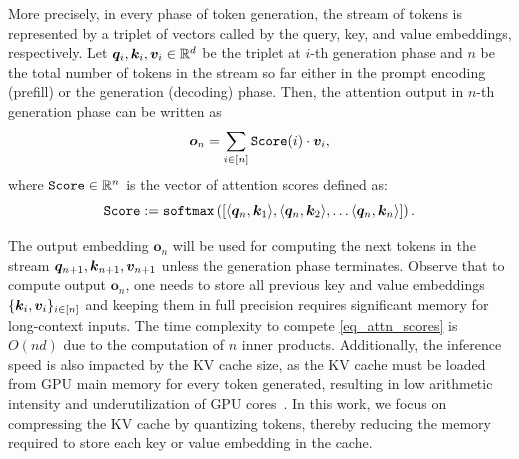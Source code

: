 \documentclass[11pt]{article}
\theoremstyle{plain}
\theoremstyle{definition}
\theoremstyle{remark}
\begin{document}
More precisely, in every phase of token generation, the stream of tokens is represented by a triplet of vectors called by the query, key, and value embeddings, respectively. 
Let ${\bm q}_i, {\bm k}_i, {\bm v}_i \in \mathbb{R}^d$ be the triplet at $i$-th generation phase and $n$ be the total number of tokens in the stream so far either in the prompt encoding (prefill) or the generation (decoding) phase. Then, the attention output in $n$-th generation phase can be written as
\begin{equation} \label{eq_attn_output}
    {\bm o}_{n} = \sum_{i \in [n]} {\tt Score}(i) \cdot {\bm v}_i, 
\end{equation}
where ${\tt Score} \in \mathbb{R}^n$ is the vector of attention scores defined as:
\begin{equation}\label{eq_attn_scores}
{\tt Score} :={\tt softmax}\left(
[\langle {\bm q}_n, {\bm k}_1 \rangle, \langle {\bm q}_n, {\bm k}_2 \rangle, \ldots \langle {\bm q}_n, {\bm k}_n \rangle]
\right).
\end{equation}

The output embedding ${\bm o}_n$ will be used for computing the next tokens in the stream ${\bm q}_{n+1}, {\bm k}_{n+1}, {\bm v}_{n+1}$ unless the generation phase terminates. 
Observe that to compute output ${\bm o}_{n}$, one needs to store all previous key and value embeddings $\{{\bm k}_i, {\bm v}_i\}_{i \in [n]}$ and keeping them in full precision requires significant memory for long-context inputs. 
The time complexity to compete \cref{eq_attn_scores} is $O(nd)$ due to the computation of $n$ inner products. 
Additionally, the inference speed is also impacted by the KV cache size, as the KV cache must be loaded from GPU main memory for every token generated, resulting in low arithmetic intensity and underutilization of GPU cores~\cite{pope2023efficiently}.
In this work, we focus on compressing the KV cache by quantizing tokens, thereby reducing the memory required to store each key or value embedding in the cache.



\end{document}
